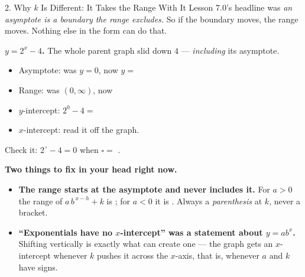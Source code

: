\documentclass[10pt]{article}
\newcommand{\lgrid}[4]{%
  \draw[step=1, linegray!40, very thin] (#1,#3) grid (#2,#4);
  \draw[->, semithick, charcoal] (#1,0)--(#2,0) node[below right, font=\scriptsize]{$x$};
  \draw[->, semithick, charcoal] (0,#3)--(0,#4) node[left, font=\scriptsize]{$y$};}
\newcommand{\expgraph}[6]{\draw[very thick, forest, domain=#5:#6, samples=140, smooth]
  plot (\x,{(#1)*exp((#2)*((\x)-(#3)))+(#4)});}
\newcommand{\hasym}[3]{\draw[navy, dashed, semithick] (#1,#3)--(#2,#3);}
\begin{document}
\begin{notesbox}{2. Why $k$ Is Different: It Takes the Range With It}
Lesson 7.0's headline was \emph{an asymptote is a boundary the range excludes.} So if the boundary
moves, the range moves. Nothing else in the form can do that.
\begin{center}
\begin{minipage}[c]{0.44\linewidth}
\centering
{}
\end{minipage}
\begin{minipage}[c]{0.52\linewidth}
\small
\textbf{$y=2^{x}-4$.} The whole parent graph slid down $4$ --- \emph{including} its asymptote.
\begin{itemize}[leftmargin=1.3em, itemsep=3pt]
  \item Asymptote: was $y=0$, now $y=$ \blank{1.2cm}
  \item Range: was $(0,\infty)$, now \blank{2.4cm}
  \item $y$-intercept: $2^{0}-4=$ \blank{1.4cm}
  \item $x$-intercept: read it off the graph. \blank{1.6cm}
\end{itemize}
Check it: $2^{\,\square}-4=0$ when $\square=$ \blank{1.0cm}. \checkmark
\end{minipage}
\end{center}

\vspace{3pt}
\begin{tcolorbox}[colback=redbg, colframe=redacc, boxrule=0.8pt, arc=1.5mm,
    left=2.5mm, right=2.5mm, top=1.5mm, bottom=1.5mm]
\textbf{Two things to fix in your head right now.}
\begin{itemize}[leftmargin=1.4em, itemsep=2pt]
  \item \textbf{The range starts at the asymptote and never includes it.} For $a>0$ the range of
        $a\,b^{\,x-h}+k$ is \blank{2.4cm}; for $a<0$ it is \blank{2.6cm}. Always a
        \emph{parenthesis} at $k$, never a bracket.
  \item \textbf{``Exponentials have no $x$-intercept'' was a statement about $y=ab^{x}$.} Shifting
        vertically is exactly what can create one --- the graph gets an $x$-intercept whenever $k$
        pushes it across the $x$-axis, that is, whenever $a$ and $k$ have \blank{2.4cm} signs.
\end{itemize}
\end{tcolorbox}


\end{notesbox}
\end{document}
